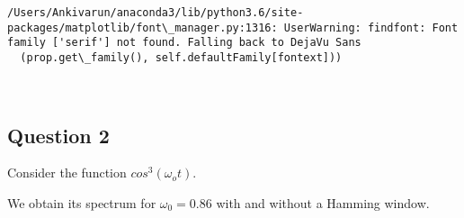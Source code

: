\documentclass[11pt]{article}
\begin{document}
    \begin{Verbatim}[commandchars=\\\{\}]
/Users/Ankivarun/anaconda3/lib/python3.6/site-packages/matplotlib/font\_manager.py:1316: UserWarning: findfont: Font family ['serif'] not found. Falling back to DejaVu Sans
  (prop.get\_family(), self.defaultFamily[fontext]))

    \end{Verbatim}

    \begin{center}
    \end{center}
    { \hspace*{\fill} \\}
    
    \subsection{Question 2}\label{question-2}

Consider the function \(cos^3(\omega_o t)\).

We obtain its spectrum for \(\omega_0=0.86\) with and without a Hamming
window.
\end{document}
